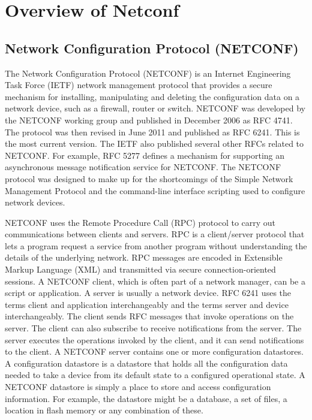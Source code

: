 \chapter{Overview of Netconf}


\section{Network Configuration Protocol (NETCONF)}

The Network Configuration Protocol (NETCONF) is an Internet Engineering Task Force (IETF) network management protocol that provides a secure mechanism for installing, manipulating and deleting the configuration data on a network device, such as a firewall, router or switch.
NETCONF was developed by the NETCONF working group and published in December 2006 as RFC 4741. The protocol was then revised in June 2011 and published as RFC 6241. This is the most current version. The IETF also published several other RFCs related to NETCONF. For example, RFC 5277 defines a mechanism for supporting an asynchronous message notification service for NETCONF.
The NETCONF protocol was designed to make up for the shortcomings of the Simple Network Management Protocol and the command-line interface scripting used to configure network devices.

NETCONF uses the Remote Procedure Call (RPC) protocol to carry out communications between clients and servers. RPC is a client/server protocol that lets a program request a service from another program without understanding the details of the underlying network. RPC messages are encoded in Extensible Markup Language (XML) and transmitted via secure connection-oriented sessions.
A NETCONF client, which is often part of a network manager, can be a script or application. A server is usually a network device. RFC 6241 uses the terms client and application interchangeably and the terms server and device interchangeably.
The client sends RFC messages that invoke operations on the server. The client can also subscribe to receive notifications from the server. The server executes the operations invoked by the client, and it can send notifications to the client.
A NETCONF server contains one or more configuration datastores. A configuration datastore is a datastore that holds all the configuration data needed to take a device from its default state to a configured operational state. A NETCONF datastore is simply a place to store and access configuration information. For example, the datastore might be a database, a set of files, a location in flash memory or any combination of these.

